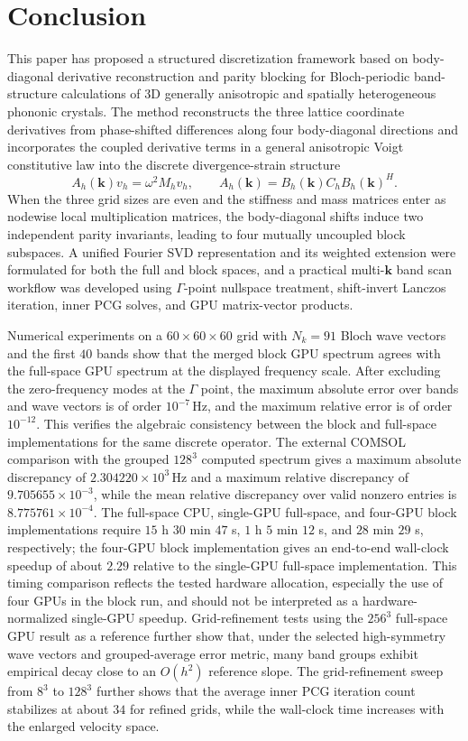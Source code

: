 \documentclass[11pt,oneside]{article}
\numberwithin{equation}{section}
\theoremstyle{plain}
\theoremstyle{remark}
\newcommand{\bk}{\bm{k}}
\begin{document}
\section{Conclusion}
\label{sec:conclusion}

This paper has proposed a structured discretization framework based on body-diagonal derivative reconstruction and parity blocking for Bloch-periodic band-structure calculations of 3D generally anisotropic and spatially heterogeneous phononic crystals. The method reconstructs the three lattice coordinate derivatives from phase-shifted differences along four body-diagonal directions and incorporates the coupled derivative terms in a general anisotropic Voigt constitutive law into the discrete divergence-strain structure
\[
A_h(\bk)v_h=\omega^2 M_hv_h,\qquad
A_h(\bk)=B_h(\bk)C_hB_h(\bk)^H.
\]
When the three grid sizes are even and the stiffness and mass matrices enter as nodewise local multiplication matrices, the body-diagonal shifts induce two independent parity invariants, leading to four mutually uncoupled block subspaces. A unified Fourier SVD representation and its weighted extension were formulated for both the full and block spaces, and a practical multi-\(\bk\) band scan workflow was developed using \(\Gamma\)-point nullspace treatment, shift-invert Lanczos iteration, inner PCG solves, and GPU matrix-vector products.

Numerical experiments on a \(60\times60\times60\) grid with \(N_k=91\) Bloch wave vectors and the first \(40\) bands show that the merged block GPU spectrum agrees with the full-space GPU spectrum at the displayed frequency scale. After excluding the zero-frequency modes at the \(\Gamma\) point, the maximum absolute error over bands and wave vectors is of order \(10^{-7}\,\mathrm{Hz}\), and the maximum relative error is of order \(10^{-12}\). This verifies the algebraic consistency between the block and full-space implementations for the same discrete operator. The external COMSOL comparison with the grouped \(128^3\) computed spectrum gives a maximum absolute discrepancy of \(2.304220\times10^3\,\mathrm{Hz}\) and a maximum relative discrepancy of \(9.705655\times10^{-3}\), while the mean relative discrepancy over valid nonzero entries is \(8.775761\times10^{-4}\). The full-space CPU, single-GPU full-space, and four-GPU block implementations require \(15\) h \(30\) min \(47\) s, \(1\) h \(5\) min \(12\) s, and \(28\) min \(29\) s, respectively; the four-GPU block implementation gives an end-to-end wall-clock speedup of about \(2.29\) relative to the single-GPU full-space implementation. This timing comparison reflects the tested hardware allocation, especially the use of four GPUs in the block run, and should not be interpreted as a hardware-normalized single-GPU speedup. Grid-refinement tests using the \(256^3\) full-space GPU result as a reference further show that, under the selected high-symmetry wave vectors and grouped-average error metric, many band groups exhibit empirical decay close to an \(O(h^2)\) reference slope. The grid-refinement sweep from \(8^3\) to \(128^3\) further shows that the average inner PCG iteration count stabilizes at about \(34\) for refined grids, while the wall-clock time increases with the enlarged velocity space.
\end{document}
